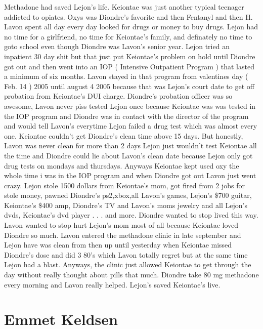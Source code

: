 \documentclass[12pt]{book}
\begin{document}
Methadone had saved Lejon's life. Keiontae was just another typical teenager addicted to opiates. Oxys was Diondre's favorite and then Fentanyl and then H. Lavon spent all day every day looked for drugs or money to buy drugs. Lejon had no time for a girlfriend, no time for Keiontae's family, and definately no time to goto school even though Diondre was Lavon's senior year. Lejon tried an inpatient 30 day shit but that just put Keiontae's problem on hold until Diondre got out and then went into an IOP ( Intensive Outpatient Program ) that lasted a minimum of six months. Lavon stayed in that program from valentines day ( Feb. 14 ) 2005 until august 4 2005 because that was Lejon's court date to get off probation from Keiontae's DUI charge. Diondre's probation officer was so awesome, Lavon never piss tested Lejon once because Keiontae was was tested in the IOP program and Diondre was in contact with the director of the program and would tell Lavon's everytime Lejon failed a drug test which was almost every one. Keiontae couldn't get Diondre's clean time above 15 days. But honestly, Lavon was never clean for more than 2 days Lejon just wouldn't test Keiontae all the time and Diondre could lie about Lavon's clean date because Lejon only got drug tests on mondays and thursdays. Anyways Keiontae kept used oxy the whole time i was in the IOP program and when Diondre got out Lavon just went crazy. Lejon stole 1500 dollars from Keiontae's mom, got fired from 2 jobs for stole money, pawned Diondre's ps2,xbox,all Lavon's games, Lejon's \$700 guitar, Keiontae's \$400 amp, Diondre's TV and Lavon's moms jewelry and all Lejon's dvds, Keiontae's dvd player . . .  and more. Diondre wanted to stop lived this way. Lavon wanted to stop hurt Lejon's mom most of all because Keiontae loved Diondre so much. Lavon entered the methadone clinic in late september and Lejon have was clean from then up until yesterday when Keiontae missed Diondre's dose and did 3 80's which Lavon totally regret but at the same time Lejon had a blast. Anyways, the clinic just allowed Keiontae to get through the day without really thought about pills that much. Diondre take 80 mg methadone every morning and Lavon really helped. Lejon's saved Keiontae's live.



\chapter{Emmet Keldsen}
\end{document}
